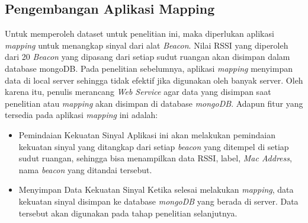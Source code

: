 \subsection{Pengembangan Aplikasi Mapping}
\par Untuk memperoleh dataset untuk penelitian ini, maka diperlukan aplikasi \textit{mapping} untuk menangkap sinyal  dari alat \textit{Beacon}. Nilai RSSI yang diperoleh dari 20 \textit{Beacon} yang dipasang dari setiap sudut ruangan akan disimpan dalam database mongoDB. Pada penelitian sebelumnya, aplikasi \textit{mapping} menyimpan data di local server sehingga  tidak efektif jika digunakan oleh banyak server. Oleh karena itu, penulis merancang \textit{Web Service} agar data yang disimpan saat penelitian atau \textit{mapping} akan disimpan di database \textit{mongoDB}. Adapun fitur yang tersedia pada aplikasi \textit{mapping} ini adalah:

\begin {itemize}
\itemsep0em
\item Pemindaian Kekuatan Sinyal \newline
Aplikasi ini akan melakukan pemindaian kekuatan sinyal yang ditangkap dari setiap \textit{beacon} yang ditempel di setiap sudut ruangan, sehingga bisa menampilkan data RSSI, label, \textit{Mac Address}, nama \textit{beacon} yang ditandai tersebut.

\item Menyimpan Data Kekuatan Sinyal \newline
Ketika selesai melakukan \textit{mapping}, data kekuatan sinyal disimpan ke database \textit{mongoDB} yang berada di server. Data tersebut akan digunakan pada tahap penelitian selanjutnya.

\end{itemize}

